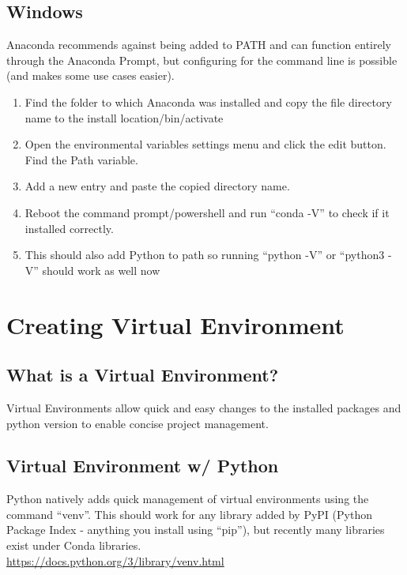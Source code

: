 \documentclass[12pt]{article}
\begin{document}
        \subsection{Windows}
            Anaconda recommends against being added to PATH and can function entirely through the Anaconda Prompt,
            but configuring for the command line is possible (and makes some use cases easier).
            \begin{enumerate}
                \item Find the folder to which Anaconda was installed and copy the file directory name to the \textlangle install location\textrangle /bin/activate
                \item Open the environmental variables settings menu and click the edit button. Find the Path variable.
                \item Add a new entry and paste the copied directory name.
                \item Reboot the command prompt/powershell and run “conda -V” to check if it installed correctly.
                \item This should also add Python to path so running “python -V” or “python3 -V” should work as well now
            \end{enumerate}
    \section{Creating Virtual Environment}
        \subsection{What is a Virtual Environment?}
            Virtual Environments allow quick and easy changes to the installed packages and python version to enable concise project management.
        \subsection{Virtual Environment w/ Python}
            Python natively adds quick management of virtual environments using the command ``venv''.
            This should work for any library added by PyPI (Python Package Index - anything you install using ``pip''), but recently many libraries exist under Conda libraries.
            \\\url{https://docs.python.org/3/library/venv.html}
\end{document}
